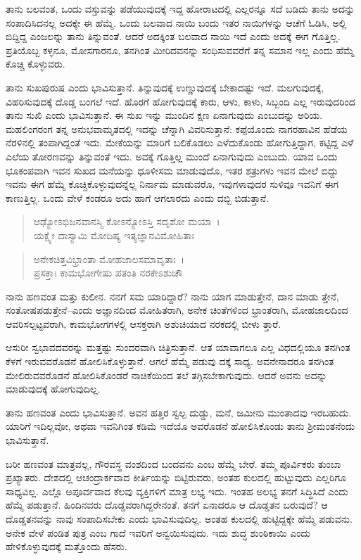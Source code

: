 ತಾನು ಬಲವಂತ, ಒಂದು ವಸ್ತುವನ್ನು ಪಡೆಯುವುದಕ್ಕೆ ಇದ್ದ ಹೋರಾಟದಲ್ಲಿ ಎಲ್ಲರನ್ನೂ ಸದೆ ಬಡಿದು ತಾನು ಅದನ್ನು ಸಂಪಾದಿಸಿದನಲ್ಲ ಅದಕ್ಕೇ ಈ ಹೆಮ್ಮೆ. ಒಂದು ಬಲವಾದ ನಾಯಿ ಬಂದು ಇತರ ನಾಯಿಗಳನ್ನು ಆಚೆಗೆ ಓಡಿಸಿ, ಅಲ್ಲಿ ಬಿದ್ದಿದ್ದ ಎಂಜಲನ್ನು ತಾನು ತಿನ್ನುವಂತೆ. ಆದರೆ ಅದಕ್ಕಿಂತ ಬಲವಾದ ನಾಯಿ ಇದೆ ಎಂದು ಅದಕ್ಕೆ ಈಗ ಗೊತ್ತಿಲ್ಲ. ಪ್ರತಿಯೊಬ್ಬ ಕಳ್ಳನೂ, ಮೋಸಗಾರನೂ, ತನಗಿಂತ ಮೀರಿದವನನ್ನು ಸಂಧಿಸುವವರೆಗೆ ತನ್ನ ಸಮಾನ ಇಲ್ಲ ಎಂದು ಹೆಮ್ಮೆ ಕೊಚ್ಚಿ ಕೊಳ್ಳುವರು.

ತಾನು ಸುಖಪುರುಷ ಎಂದು ಭಾವಿಸುತ್ತಾನೆ. ತಿನ್ನುವುದಕ್ಕೆ ಉಣ್ಣುವುದಕ್ಕೆ ಬೇಕಾದಷ್ಟು ಇದೆ. ಮಲಗುವುದಕ್ಕೆ, ವಿಹರಿಸುವುದಕ್ಕೆ ದೊಡ್ಡ ಬಂಗಲೆ ಇದೆ. ಹೊರಗೆ ಹೋಗುವುದಕ್ಕೆ ಕಾರು, ಆಳು, ಕಾಳು, ಸಿಬ್ಬಂದಿ ಎಲ್ಲ ಇರುವುದರಿಂದ ತಾನು ಸುಖಿ ಎಂದು ಭಾವಿಸುತ್ತಾನೆ. ಈ ಸುಖ ಇನ್ನು ಮುಂದಿನ ಕ್ಷಣ ಏನಾಗುವುದು ಎಂಬುದನ್ನು ಅರಿಯ. ಮಹಲಿಂಗರಂಗ ತನ್ನ ಅನುಭವಾಮೃತದಲ್ಲಿ ಇದನ್ನು ಚೆನ್ನಾಗಿ ವಿವರಿಸುತ್ತಾನೆ: ಕಪ್ಪೆಯೊಂದು ನಾಗರಹಾವಿನ ಹೆಡೆಯ ನೆರಳಿನಲ್ಲಿ ತಂಪಾಗಿದ್ದಂತೆ ಇದು. ಮೇಕೆಯನ್ನು ಮಾರಿಗೆ ಬಲಿಕೊಡಲು ಎಳೆದುಕೊಂಡು ಹೋಗುತ್ತಿದ್ದಾಗ, ಕಟ್ಟಿದ್ದ ಎಳೆ ಎಲೆಯ ತೋರಣವನ್ನು ತಿನ್ನುವಂತೆ ಇದು. ಅವಕ್ಕೆ ಗೊತ್ತಿಲ್ಲ ಮುಂದೆ ಏನಾಗುವುದು ಎಂಬುದು. ಯಾವ ಒಂದು ಭೂಕಂಪವಾಗಿ ಇವನ ಸುಖದ ಮನೆಯನ್ನು ಧೂಳೀಸಮ ಮಾಡುವುದೊ, ಇತರ ಶತ್ರುಗಳು ಇವನ ಮೇಲೆ ಬಿದ್ದು ಇವನು ಈಗ ಹೆಮ್ಮೆ ಕೊಚ್ಚಿಕೊಳ್ಳುವುದನ್ನೆಲ್ಲ ನಿರ್ನಾಮ ಮಾಡುವರೊ, ಇವುಗಳಾವುದರ ಸುಳಿವೂ ಇವನಿಗೆ ಈಗ ಕಾಣುತ್ತಿಲ್ಲ. ಒಂದು ವೇಳೆ ಕಂಡರೂ ಅದು ಹಾಗೆ ಆಗಲಾರದು ಎಂದು ದಬ್ಬಿ ಬಿಡುತ್ತಾನೆ.

\begin{verse}
ಆಢ್ಯೋಽಭಿಜನವಾನಸ್ಮಿ ಕೋಽನ್ಯೋಽಸ್ತಿ ಸದೃಶೋ ಮಯಾ~।\\ಯಕ್ಷ್ಯೇ ದಾಸ್ಯಾಮಿ ಮೋದಿಷ್ಯ ಇತ್ಯಜ್ಞಾನವಿಮೋಹಿತಾಃ 
\end{verse}

\begin{verse}
ಅನೇಕಚಿತ್ತವಿಭ್ರಾಂತಾ ಮೋಹಜಾಲಸಮಾವೃತಾಃ~।\\ಪ್ರಸಕ್ತಾಃ ಕಾಮಭೋಗೇಷು ಪತಂತಿ ನರಕೇಽಶುಚೌ 
\end{verse}

{\small ನಾನು ಹಣವಂತ ಮತ್ತು ಕುಲೀನ. ನನಗೆ ಸಮ ಯಾರಿದ್ದಾರೆ? ನಾನು ಯಾಗ ಮಾಡುತ್ತೇನೆ, ದಾನ ಮಾಡು ತ್ತೇನೆ, ಸಂತೋಷಪಡುತ್ತೇನೆ–ಎಂದು ಅಜ್ಞಾನದಿಂದ ಮೋಹಿತರಾಗಿ, ಅನೇಕ ಚಿಂತೆಗಳಿಂದ ಭ್ರಾಂತರಾಗಿ, ಮೋಹಜಾಲದಿಂದ ಆವರಿಸಲ್ಪಟ್ಟವರಾಗಿ, ಕಾಮಭೋಗಗಳಲ್ಲಿ ಆಸಕ್ತರಾಗಿ ಅಶುಚಿಯಾದ ನರಕದಲ್ಲಿ ಬೀಳು ತ್ತಾರೆ.}

ಆಸುರೀ ಸ್ವಭಾವದವರನ್ನು ಮತ್ತಷ್ಟು ಸುಂದರವಾಗಿ ಚಿತ್ರಿಸುತ್ತಾನೆ. ಆತ ಯಾವಾಗಲೂ ಎಲ್ಲ ವಿಧದಲ್ಲಿಯೂ ತನಗಿಂತ ಕೆಳಗೆ ಇರುವವರೊಡನೆ ಹೋಲಿಸಿಕೊಳ್ಳುತ್ತಾನೆ. ಆಗಲೆ ಹೆಮ್ಮೆ ಪಡುವು ದಕ್ಕೆ ಸಾಧ್ಯ. ಅವನೇನಾದರೂ ತನಗಿಂತ ಮೇಲಿರುವವರೊಡನೆ ಹೋಲಿಸಿಕೊಂಡರೆ ನಾಚಿಕೆಯಿಂದ ತಲೆ ತಗ್ಗಿಸಬೇಕಾಗುವುದು. ಆದರೆ ಅವನು ಅದನ್ನು ಮಾಡುವುದಕ್ಕೆ ಹೋಗುವುದಿಲ್ಲ.

ತಾನು ಹಣವಂತ ಎಂದು ಭಾವಿಸುತ್ತಾನೆ. ಅವನ ಹತ್ತಿರ ಸ್ವಲ್ಪ ದುಡ್ಡು, ಮನೆ, ಜಮೀನು ಮುಂತಾದವು ಇರಬಹುದು. ಯಾರಿಗೆ ಇದಿಲ್ಲವೋ, ಅಥವಾ ಇವನಿಗಿಂತ ಕಡಿಮೆ ಇದೆಯೊ ಅವರೊಡನೆ ಹೋಲಿಸಿಕೊಂಡು ತಾನು ಶ‍್ರೀಮಂತನೆಂದು ಭಾವಿಸುತ್ತಾನೆ.

ಬರೀ ಹಣವಂತ ಮಾತ್ರವಲ್ಲ, ಗೌರವಸ್ಥ ವಂಶದಿಂದ ಬಂದವನು ಎಂಬ ಹೆಮ್ಮೆ ಬೇರೆ. ತಮ್ಮ ಪೂರ್ವಿಕರು ತುಂಬಾ ಪ್ರಖ್ಯಾತರು. ದೇಶದಲ್ಲಿ ಆಚಂದ್ರಾರ್ಕವಾದ ಕೀರ್ತಿಯನ್ನು ಬಿಟ್ಟಿರುವರು, ಅಂತಹ ಕುಲದಲ್ಲಿ ಹುಟ್ಟುವುದು ಎಲ್ಲರಿಗೂ ಸಾಧ್ಯವಿಲ್ಲ. ಎಲ್ಲೊ ಅಪೂರ್ವವಾದ ಕೆಲವು ವ್ಯಕ್ತಿಗಳಿಗೆ ಮಾತ್ರ ಲಭ್ಯ ಇದು. ಇಂತಹ ಅಲಭ್ಯ ತನಗೆ ಸಿದ್ಧಿಸಿದೆ ಎಂದು ಹೆಮ್ಮೆ ಪಡುತ್ತಾನೆ. ಹಿಂದಿನವರು ದೊಡ್ಡವರಾಗಿದ್ದರೇನಂತೆ. ತನಗೆ ಏನಾದರೂ ಆ ದೊಡ್ಡತನ ಬರುವುದೆ? ಆ ದೊಡ್ಡತನವನ್ನು ನಾವು ಸಂಪಾದಿಸಬೇಕು ಎಂದು ಭಾವಿಸುವುದಿಲ್ಲ. ಅಂತಹ ಕುಲದಲ್ಲಿ ಹುಟ್ಟಿದ್ದಕ್ಕೇ ಹೆಮ್ಮೆ ಪಡುವನು. ಅನೇಕ ವೇಳೆ ಪಂಡಿತ ಪುತ್ರ ಎಂಬ ಗಾದೆ ಇವರಿಗೆ ಅನ್ವಯಿಸುವುದು. ಇದು ಶುದ್ಧ ಶುಂಠಿಕಾಯಿ ಎಂದು ಹೇಳಿಕೊಳ್ಳುವುದಕ್ಕೆ ಮತ್ತೊಂದು ಹೆಸರು.

